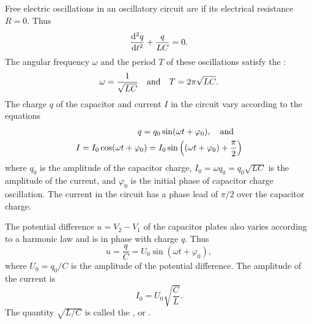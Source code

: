 \subsection{}\label{28.3.2} Free electric oscillations in an oscillatory circuit are  if its electrical resistance $R = 0$. Thus
\begin{equation*}%
\dv[2]{q}{t} + \frac{q}{LC} = 0.
\end{equation*}
The angular frequency $\omega$ and the period $T$ of these oscillations satisfy the :
\begin{equation*}%
\omega = \frac{1}{\sqrt{LC}} \qand T = 2 \pi \sqrt{LC}.
\end{equation*}
The charge $q$ of the capacitor and current $I$ in the circuit vary according to the equations
\begin{align*}%
q = q_{0} \sin ( \omega t + \varphi_{0}), \qand \\
I = I_{0} \cos ( \omega t + \varphi_{0}) = I_{0} \sin \left( ( \omega t + \varphi_{0}) + \frac{\pi}{2} \right)
\end{align*}
where $q_{0}$ is the amplitude of the capacitor charge, $I_{0} =\omega q_{0} = q_{0}\sqrt{LC}$ is the amplitude of the current, and $\varphi_{0}$ is the initial phase of capacitor charge oscillation. The current in the circuit has a phase lead of $\pi/2$ over the capacitor charge.

The potential difference $u = V_{2}- V_{1}$ of the capacitor plates also varies according to a harmonic law and is in phase with charge $q$. Thus
\begin{equation*}%
u= \frac{q}{C} = U_{0} \sin ( \omega t + \varphi_{0}),
\end{equation*}
where $U_{0} = q_{0}/C$ is the amplitude of the potential difference. The amplitude of the current is
\begin{equation*}%
I_{0} = U_{0} \sqrt{\frac{C}{L}}.
\end{equation*}
The quantity $\sqrt{L/C}$ is called the , or .

